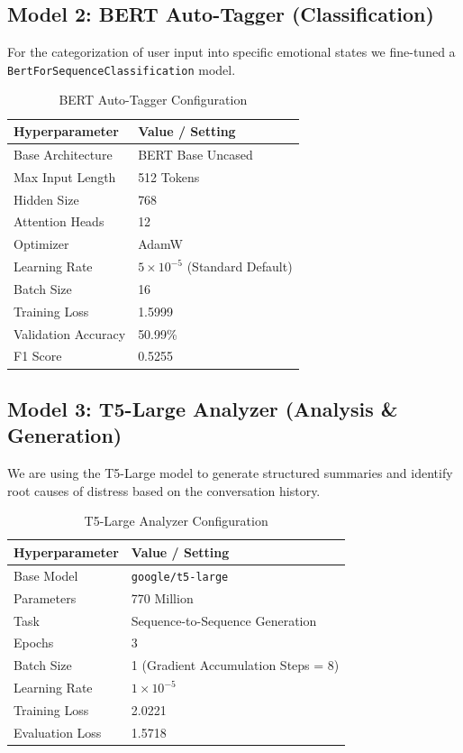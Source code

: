 \subsection{Model 2: BERT Auto-Tagger (Classification)}
For the categorization of user input into specific emotional states we fine-tuned a \texttt{BertForSequenceClassification} model.

\begin{table}[H]
\centering
\renewcommand{\arraystretch}{1.2}
\begin{tabular}{|l|l|}
\hline
\rowcolor{gray!15} \textbf{Hyperparameter} & \textbf{Value / Setting} \\ \hline
Base Architecture & BERT Base Uncased \\ \hline
Max Input Length & 512 Tokens \\ \hline
Hidden Size & 768 \\ \hline
Attention Heads & 12 \\ \hline
Optimizer & AdamW \\ \hline
Learning Rate & $5 \times 10^{-5}$ (Standard Default) \\ \hline
Batch Size & 16 \\ \hline
Training Loss & 1.5999 \\ \hline
Validation Accuracy & 50.99\% \\ \hline
F1 Score & 0.5255 \\ \hline
\end{tabular}
\caption{BERT Auto-Tagger Configuration}
\label{tab:bert_config}
\end{table}

\subsection{Model 3: T5-Large Analyzer (Analysis \& Generation)}
We are using the T5-Large model to generate structured summaries and identify root causes of distress based on the conversation history.

\begin{table}[H]
\centering
\renewcommand{\arraystretch}{1.2}
\begin{tabular}{|l|l|}
\hline
\rowcolor{gray!15} \textbf{Hyperparameter} & \textbf{Value / Setting} \\ \hline
Base Model & \texttt{google/t5-large} \\ \hline
Parameters & 770 Million \\ \hline
Task & Sequence-to-Sequence Generation \\ \hline
Epochs & 3 \\ \hline
Batch Size & 1 (Gradient Accumulation Steps = 8) \\ \hline
Learning Rate & $1 \times 10^{-5}$ \\ \hline
Training Loss & 2.0221 \\ \hline
Evaluation Loss & 1.5718 \\ \hline
\end{tabular}
\caption{T5-Large Analyzer Configuration}
\label{tab:t5_config}
\end{table}

